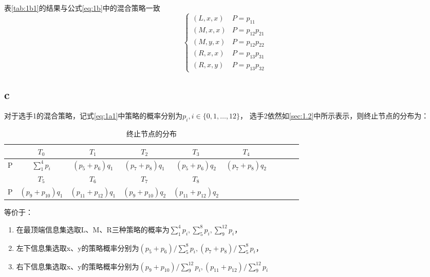 \documentclass[a4paper,12pt]{article}
\begin{document}
表\ref{tab:1b1}的结果与公式\ref{eq:1b}中的混合策略一致
\begin{equation}
    \begin{cases}
        (L,x,x) & P=p_{11}       \\
        (M,x,x) & P=p_{12}p_{21} \\
        (M,y,x) & P=p_{12}p_{22} \\
        (R,x,x) & P=p_{13}p_{31} \\
        (R,x,y) & P=p_{13}p_{32}
    \end{cases}
    \label{eq:1b}
\end{equation}

\subsection{c}

对于选手1的混合策略，记式\ref{eq:1a1}中策略的概率分别为$p_i,i\in \{ 0,1,\dots,12 \}$，
选手2依然如\ref{sec:1.2}中所示表示，则终止节点的分布为：

\begin{table}[H]
    \centering
    \begin{tabular}{cccccccccc}
          & $T_0$             & $T_1$                & $T_2$             & $T_3$                & $T_4$          \\ \hline
        P & $\sum_1^4p_i$     & $(p_5+p_6)q_1$       & $(p_7+p_8)q_1$    & $(p_5+p_6)q_2$       & $(p_7+p_8)q_2$ \\ \hline
          & $T_5$             & $T_6$                & $T_7$             & $T_8$                &                \\\hline
        P & $(p_9+p_{10})q_1$ & $(p_{11}+p_{12})q_1$ & $(p_9+p_{10})q_2$ & $(p_{11}+p_{12})q_2$ &                \\\hline
    \end{tabular}
    \caption{终止节点的分布}\label{tab:1b2}
\end{table}

等价于：
\begin{enumerate}
    \item 在最顶端信息集选取L、M、R三种策略的概率为$\sum_1^4p_i,\sum_5^8p_i,\sum_9^{12}p_i$，
    \item 左下信息集选取x、y的策略概率分别为$(p_5+p_6)/\sum_{5}^{8}p_i,(p_7+p_8)/\sum_{5}^{8}p_i$，
    \item 右下信息集选取x、y的策略概率分别为$(p_9+p_{10})/\sum_{9}^{12}p_i,(p_{11}+p_{12})/\sum_{9}^{12}p_i$
\end{enumerate}
\end{document}
